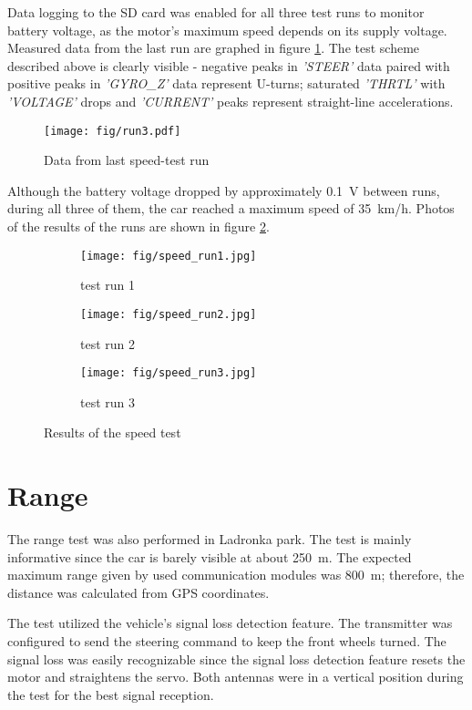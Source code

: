 Data logging to the SD card was enabled for all three test runs to monitor battery voltage, as the motor's maximum speed depends on its supply voltage. Measured data from the last run are graphed in figure \ref{fig:sd_speed}. The test scheme described above is clearly visible - negative peaks in \textit{'STEER'} data paired with positive peaks in \textit{'GYRO\_Z'} data represent U-turns; saturated \textit{'THRTL'} with \textit{'VOLTAGE'} drops and \textit{'CURRENT'} peaks represent straight-line accelerations.
\begin{figure}[h]
\centering
\texttt{[image: fig/run3.pdf]}
\caption{Data from last speed-test run}
\label{fig:sd_speed}
\end{figure}

Although the battery voltage dropped by approximately \SI{0.1}{\V} between runs, during all three of them, the car reached a maximum speed of \SI{35}{km/h}. Photos of the results of the runs are shown in figure \ref{fig:speed}.
\begin{figure}[h]
    \centering
    \begin{subfigure}{0.3\textwidth}
    \centering
        \texttt{[image: fig/speed\_run1.jpg]}
		\caption{test run 1}
    \end{subfigure}%
    \hspace{0.2cm}
    \begin{subfigure}{0.3\textwidth}
    \centering
		\texttt{[image: fig/speed\_run2.jpg]}
		\caption{test run 2}
    \end{subfigure}
    \hspace{0.2cm}
    \begin{subfigure}{0.3\textwidth}
    \centering
		\texttt{[image: fig/speed\_run3.jpg]}
		\caption{test run 3}
    \end{subfigure}
	\caption{Results of the speed test}
    \label{fig:speed}
\end{figure}

\section{Range}
The range test was also performed in Ladronka park. The test is mainly informative since the car is barely visible at about \SI{250}{\m}. The expected maximum range given by used communication modules was \SI{800}{\m}; therefore, the distance was calculated from GPS coordinates.

The test utilized the vehicle's signal loss detection feature. The transmitter was configured to send the steering command to keep the front wheels turned. The signal loss was easily recognizable since the signal loss detection feature resets the motor and straightens the servo. Both antennas were in a vertical position during the test for the best signal reception.

